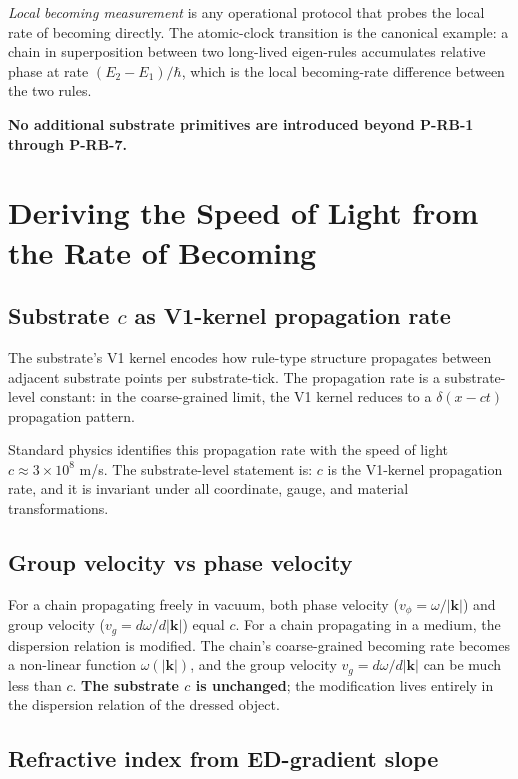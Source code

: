 \documentclass[11pt,a4paper]{article}
\begin{document}
\emph{Local becoming measurement} is any operational protocol that probes the local rate of becoming directly. The atomic-clock transition is the canonical example: a chain in superposition between two long-lived eigen-rules accumulates relative phase at rate $(E_2 - E_1)/\hbar$, which is the local becoming-rate difference between the two rules.

\textbf{No additional substrate primitives are introduced beyond P-RB-1 through P-RB-7.}

\section{Deriving the Speed of Light from the Rate of Becoming}

\subsection{Substrate $c$ as V1-kernel propagation rate}

The substrate's V1 kernel encodes how rule-type structure propagates between adjacent substrate points per substrate-tick. The propagation rate is a substrate-level constant: in the coarse-grained limit, the V1 kernel reduces to a $\delta(x - ct)$ propagation pattern.

Standard physics identifies this propagation rate with the speed of light $c \approx 3\times 10^8$ m/s. The substrate-level statement is: $c$ is the V1-kernel propagation rate, and it is invariant under all coordinate, gauge, and material transformations.

\subsection{Group velocity vs phase velocity}

For a chain propagating freely in vacuum, both phase velocity ($v_\phi = \omega/|\mathbf{k}|$) and group velocity ($v_g = d\omega/d|\mathbf{k}|$) equal $c$. For a chain propagating in a medium, the dispersion relation is modified. The chain's coarse-grained becoming rate becomes a non-linear function $\omega(|\mathbf{k}|)$, and the group velocity $v_g = d\omega/d|\mathbf{k}|$ can be much less than $c$. \textbf{The substrate $c$ is unchanged}; the modification lives entirely in the dispersion relation of the dressed object.

\subsection{Refractive index from ED-gradient slope}
\end{document}
